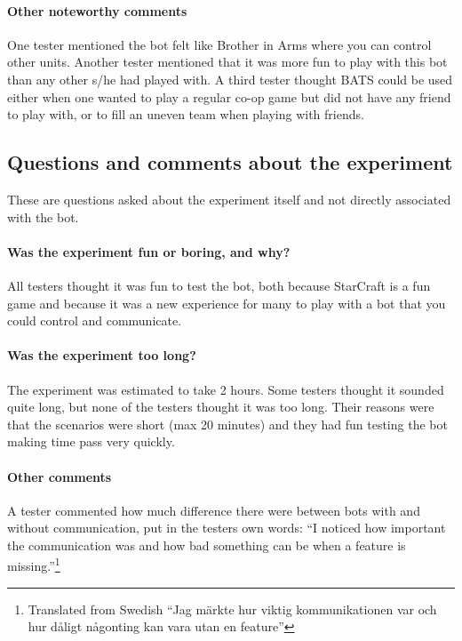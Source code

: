 \paragraph{Other noteworthy comments}
One tester mentioned the bot felt like Brother in Arms where you can control other units. Another tester mentioned that it was more fun to play with this bot than any other s/he had played with. A third tester thought BATS could be used either when one wanted to play a regular co-op game but did not have any friend to play with, or to fill an uneven team when playing with friends.

\subsection{Questions and comments about the experiment}
These are questions asked about the experiment itself and not directly associated with the bot.

\paragraph{Was the experiment fun or boring, and why?}
All testers thought it was fun to test the bot, both because StarCraft is a fun game and because it was a new experience for many to play with a bot that you could control and communicate.

\paragraph{Was the experiment too long?}
The experiment was estimated to take 2 hours. Some testers thought it sounded quite long, but none of the testers thought it was too long. Their reasons were that the scenarios were short (max 20 minutes) and they had fun testing the bot making time pass very quickly.

\paragraph{Other comments}
A tester commented how much difference there were between bots with and without communication, put in the testers own words: ``I noticed how important the communication was and how bad something can be when a feature is missing.''\footnote{Translated from Swedish ``Jag märkte hur viktig kommunikationen var och hur dåligt någonting kan vara utan en feature''}